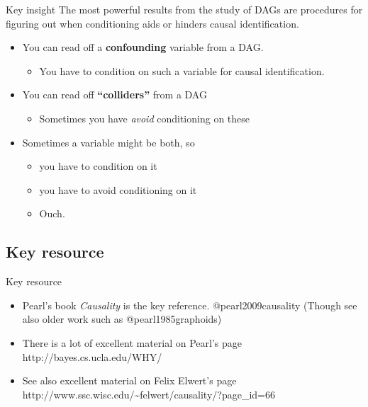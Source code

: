 \documentclass[
  11pt,
  ignorenonframetext,
]{beamer}
\providecommand{\tightlist}{%
  \setlength{\itemsep}{0pt}\setlength{\parskip}{0pt}}\usepackage{longtable,booktabs,array}
\begin{document}
\begin{frame}{Key insight}
The most powerful results from the study of DAGs are procedures for
figuring out when conditioning aids or hinders causal identification.

\begin{itemize}
\tightlist
\item
  You can read off a \textbf{confounding} variable from a DAG.

  \begin{itemize}
  \tightlist
  \item
    You have to condition on such a variable for causal identification.
  \end{itemize}
\item
  You can read off \textbf{``colliders''} from a DAG

  \begin{itemize}
  \tightlist
  \item
    Sometimes you have \emph{avoid} conditioning on these
  \end{itemize}
\item
  Sometimes a variable might be both, so

  \begin{itemize}
  \tightlist
  \item
    you have to condition on it
  \item
    you have to avoid conditioning on it
  \item
    Ouch.
  \end{itemize}
\end{itemize}
\end{frame}

\hypertarget{key-resource}{%
\subsection{Key resource}\label{key-resource}}

\begin{frame}{Key resource}
\begin{itemize}
\item
  Pearl's book \emph{Causality} is the key reference.
  @pearl2009causality (Though see also older work such as
  @pearl1985graphoids)
\item
  There is a lot of excellent material on Pearl's page
  http://bayes.cs.ucla.edu/WHY/
\item
  See also excellent material on Felix Elwert's page
  http://www.ssc.wisc.edu/\textasciitilde felwert/causality/?page\_id=66
\end{itemize}
\end{frame}
\end{document}
